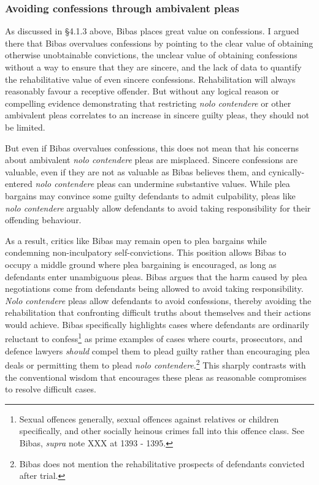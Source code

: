 \subsubsection{Avoiding confessions through ambivalent pleas}

As discussed in \S 4.1.3 above, Bibas places great value on confessions. I argued there that Bibas overvalues confessions by pointing to the clear value of obtaining otherwise unobtainable convictions, the unclear value of obtaining confessions without a way to ensure that they are sincere, and the lack of data to quantify the rehabilitative value of even sincere confessions. Rehabilitation will always reasonably favour a receptive offender. But without any logical reason or compelling evidence demonstrating that restricting \textit{nolo contendere} or other ambivalent pleas correlates to an increase in sincere guilty pleas, they should not be limited.

But even if Bibas overvalues confessions, this does not mean that his concerns about ambivalent \textit{nolo contendere} pleas are misplaced. Sincere confessions are valuable, even if they are not as valuable as Bibas believes them, and cynically-entered \textit{nolo contendere} pleas can undermine substantive values. While plea bargains may convince some guilty defendants to admit culpability, pleas like \textit{nolo contendere} arguably allow defendants to avoid taking responsibility for their offending behaviour. 

As a result, critics like Bibas may remain open to plea bargains while condemning non-inculpatory self-convictions. This position allows Bibas to occupy a middle ground where  plea bargaining is encouraged, as long as defendants enter unambiguous pleas. Bibas argues that the harm caused by plea negotiations come from defendants being allowed to avoid taking responsibility. \textit{Nolo contendere} pleas allow defendants to avoid confessions, thereby avoiding the rehabilitation that confronting difficult truths about themselves and their actions would achieve. Bibas specifically highlights cases where defendants are ordinarily reluctant to confess\footnote{Sexual offences generally, sexual offences against relatives or children specifically, and other socially heinous crimes fall into this offence class. See Bibas, \textit{supra} note XXX at 1393 - 1395.} as prime examples of cases where courts, prosecutors, and defence lawyers \textit{should} compel them to plead guilty rather than encouraging plea deals or permitting them to plead \textit{nolo contendere}.\footnote{Bibas does not mention the rehabilitative prospects of defendants convicted after trial.} This sharply contrasts with the conventional wisdom that encourages these pleas as reasonable compromises to resolve difficult cases.

